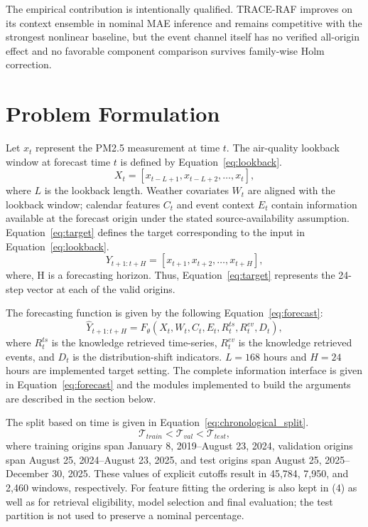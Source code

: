 \documentclass{ieeeaccess}
\begin{document}
The empirical contribution is intentionally qualified. TRACE-RAF improves on its context ensemble in nominal MAE inference and remains competitive with the strongest nonlinear baseline, but the event channel itself has no verified all-origin effect and no favorable component comparison survives family-wise Holm correction.

\section{Problem Formulation}

Let $x_{t}$ represent the PM2.5 measurement at time $t$. The air-quality lookback window at forecast time $t$ is defined by Equation~\eqref{eq:lookback}.
\begin{equation}
    X_t = [x_{t-L+1}, x_{t-L+2}, \ldots, x_t],
    \label{eq:lookback}
\end{equation}
where $L$ is the lookback length. Weather covariates $W_{t}$ are aligned with the lookback window; calendar features $C_{t}$ and event context $E_{t}$ contain information available at the forecast origin under the stated source-availability assumption. Equation~\eqref{eq:target} defines the target corresponding to the input in Equation~\eqref{eq:lookback}.
\begin{equation}
    Y_{t+1:t+H} = [x_{t+1}, x_{t+2}, \ldots, x_{t+H}],
    \label{eq:target}
\end{equation}
where, H is a forecasting horizon. Thus, Equation~\eqref{eq:target} represents the 24-step vector at each of the valid origins.

The forecasting function is given by the following Equation~\eqref{eq:forecast}:
\begin{equation}
    \hat{Y}_{t+1:t+H} =
    F_{\theta}(X_t, W_t, C_t, E_t, R^{ts}_t, R^{ev}_t, D_t),
    \label{eq:forecast}
\end{equation}
where $R^{ts}_t$ is the knowledge retrieved time-series, $R^{ev}_t$ is the knowledge retrieved events, and $D_{t}$ is the distribution-shift indicators. $L=168$ hours and $H=24$ hours are implemented target setting. The complete information interface is given in Equation~\eqref{eq:forecast} and the modules implemented to build the arguments are described in the section below.

The split based on time is given in Equation~\eqref{eq:chronological_split}.
\begin{equation}
    \mathcal{T}_{train} < \mathcal{T}_{val} < \mathcal{T}_{test},
    \label{eq:chronological_split}
\end{equation}
where training origins span January 8, 2019--August 23, 2024, validation origins span August 25, 2024--August 23, 2025, and test origins span August 25, 2025--December 30, 2025. These values of explicit cutoffs result in 45,784, 7,950, and 2,460 windows, respectively. For feature fitting the ordering is also kept in (4) as well as for retrieval eligibility, model selection and final evaluation; the test partition is not used to preserve a nominal percentage.
\end{document}

